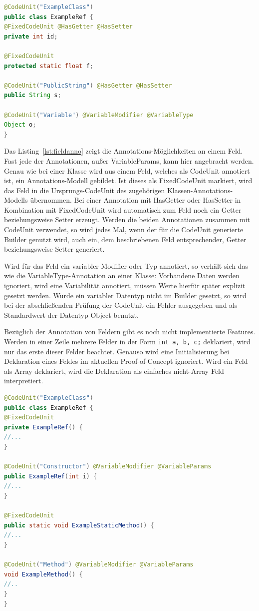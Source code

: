 \documentclass[12pt,oneside,a4paper,parskip]{scrbook}
\begin{document}
\begin{lstlisting}[label=lst:fieldanno,
language=java,
firstnumber=1,
caption=Darstellung der Annotations-Möglichkeiten an einem Feld.]
@CodeUnit("ExampleClass")
public class ExampleRef {
@FixedCodeUnit @HasGetter @HasSetter
private int id;

@FixedCodeUnit
protected static float f;

@CodeUnit("PublicString") @HasGetter @HasSetter
public String s;

@CodeUnit("Variable") @VariableModifier @VariableType
Object o;
}
\end{lstlisting}

Das Listing~\ref{lst:fieldanno} zeigt die Annotations-Möglichkeiten an einem Feld. Fast jede der Annotationen, außer VariableParams, kann hier angebracht werden. Genau wie bei einer Klasse wird aus einem Feld, welches als CodeUnit annotiert ist, ein Annotations-Modell gebildet. Ist dieses als FixedCodeUnit markiert, wird das Feld in die Ursprungs-CodeUnit des zugehörigen Klassen-Annotations-Modells übernommen. Bei einer Annotation mit HasGetter oder HasSetter in Kombination mit FixedCodeUnit wird automatisch zum Feld noch ein Getter beziehungsweise Setter erzeugt. Werden die beiden Annotationen zusammen mit CodeUnit verwendet, so wird jedes Mal, wenn der für die CodeUnit generierte Builder genutzt wird, auch ein, dem beschriebenen Feld entsprechender, Getter beziehungsweise Setter generiert.

Wird für das Feld ein variabler Modifier oder Typ annotiert, so verhält sich das wie die VariableType-Annotation an einer Klasse: Vorhandene Daten werden ignoriert, wird eine Variabilität annotiert, müssen Werte hierfür später explizit gesetzt werden. Wurde ein variabler Datentyp nicht im Builder gesetzt, so wird bei der abschließenden Prüfung der CodeUnit ein Fehler ausgegeben und als Standardwert der Datentyp Object benutzt.

Bezüglich der Annotation von Feldern gibt es noch nicht implementierte Features. Werden in einer Zeile mehrere Felder in der Form \texttt{int a, b, c;} deklariert, wird nur das erste dieser Felder beachtet. Genauso wird eine Initialisierung bei Deklaration eines Feldes im aktuellen Proof-of-Concept ignoriert. Wird ein Feld als Array deklariert, wird die Deklaration als einfaches nicht-Array Feld interpretiert.

\begin{lstlisting}[label=lst:constrmethoanno,
language=java,
firstnumber=1,
caption=Darstellung der Annotations-Möglichkeiten von Konstruktoren und Methoden.]
@CodeUnit("ExampleClass")
public class ExampleRef {
@FixedCodeUnit
private ExampleRef() {
//...
}

@CodeUnit("Constructor") @VariableModifier @VariableParams
public ExampleRef(int i) {
//...
}

@FixedCodeUnit
public static void ExampleStaticMethod() {
//...
}

@CodeUnit("Method") @VariableModifier @VariableParams
void ExampleMethod() {
//..
}
}
\end{lstlisting}
\end{document}
